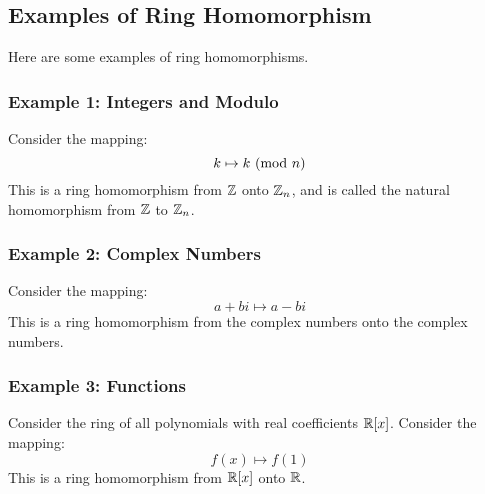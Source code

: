 \documentclass[letterpaper]{article}
\begin{document}
\subsection{Examples of Ring Homomorphism}
Here are some examples of ring homomorphisms.

\subsubsection{Example 1: Integers and Modulo}
Consider the mapping: 
\[k \mapsto k \ (\mathrm{mod}\ n)\]
This is a ring homomorphism from $\mathbb{Z}$ onto $\mathbb{Z}_{n}$, and is called the natural homomorphism from $\mathbb{Z}$ to $\mathbb{Z}_{n}$. 

\subsubsection{Example 2: Complex Numbers}
Consider the mapping: 
\[a + bi \mapsto a - bi\]
This is a ring homomorphism from the complex numbers onto the complex numbers. 

\subsubsection{Example 3: Functions}
Consider the ring of all polynomials with real coefficients $\mathbb{R}[x]$. Consider the mapping:
\[f(x) \mapsto f(1)\]
This is a ring homomorphism from $\mathbb{R}[x]$ onto $\mathbb{R}$. 
\end{document}
